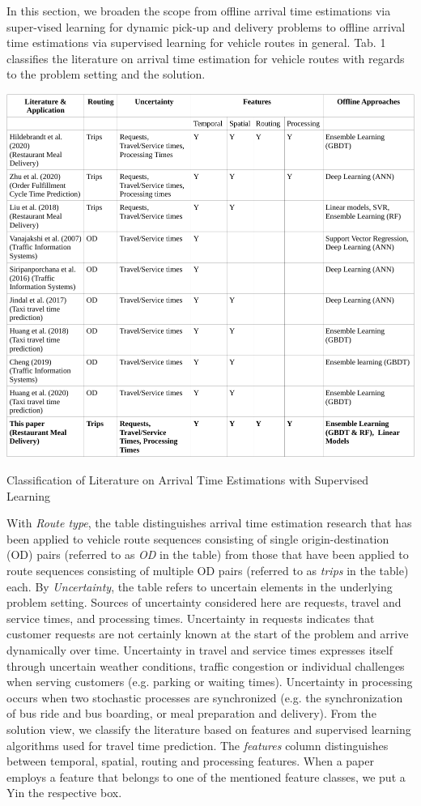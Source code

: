 In this section, we broaden the scope from offline arrival time estimations via super-vised learning for dynamic pick-up and delivery problems to offline arrival time estimations via supervised learning for vehicle routes in general.
Tab. 1 classifies the literature on arrival time estimation for vehicle routes with regards to the problem setting and the solution.
\begin{table}
	\centering
	\includegraphics[width=\linewidth]{figures/LiteratureClassification.pdf}
	\caption{Classification of Literature on Arrival Time Estimations with Supervised Learning}
	\label{tab:literatureTable}
\end{table}
With \textit{Route type}, the table distinguishes arrival time estimation research that has been applied to vehicle route sequences consisting of single origin-destination (OD) pairs (referred to as \textit{OD} in the table) from those that have been applied to route sequences consisting of multiple OD pairs (referred to as \textit{trips} in the table) each.
By \textit{Uncertainty}, the table refers to uncertain elements in the underlying problem setting. Sources of uncertainty considered here are requests, travel and service times, and processing times. Uncertainty in requests indicates that customer requests are not certainly known at the start of the problem and arrive dynamically over time. Uncertainty in travel and service times expresses itself through uncertain weather conditions, traffic congestion or individual challenges when serving customers (e.g. parking or waiting times). Uncertainty in processing occurs when two stochastic processes are synchronized (e.g. the synchronization of bus ride and bus boarding, or meal preparation and delivery). From the solution view, we classify the literature based on features and supervised learning algorithms used for travel time prediction. The \textit{features} column distinguishes between temporal, spatial, routing and processing features. When a paper employs a feature that belongs to one of the mentioned feature classes, we put a \glqq Y\grqq in the respective box. 
